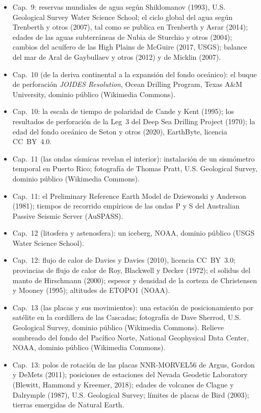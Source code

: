 \begin{itemize}
  \item Cap.~9: reservas mundiales de agua según Shiklomanov (1993), U.S. Geological Survey Water Science School; el ciclo global del agua según Trenberth y otros (2007), tal como se publica en Trenberth y Asrar (2014); edades de las aguas subterráneas de Nubia de Sturchio y otros (2004); cambios del acuífero de las High Plains de McGuire (2017, USGS); balance del mar de Aral de Gaybullaev y otros (2012) y de Micklin (2007).
  \item Cap.~10 (de la deriva continental a la expansión del fondo oceánico): el buque de perforación \emph{JOIDES Resolution}, Ocean Drilling Program, Texas A\&M University, dominio público (Wikimedia Commons).
  \item Cap.~10: la escala de tiempo de polaridad de Cande y Kent (1995); los resultados de perforación de la Leg~3 del Deep Sea Drilling Project (1970); la edad del fondo oceánico de Seton y otros (2020), EarthByte, licencia CC~BY~4.0.
  \item Cap.~11 (las ondas sísmicas revelan el interior): instalación de un sismómetro temporal en Puerto Rico; fotografía de Thomas Pratt, U.S. Geological Survey, dominio público (Wikimedia Commons).
  \item Cap.~11: el Preliminary Reference Earth Model de Dziewonski y Anderson (1981); tiempos de recorrido empíricos de las ondas P y S del Australian Passive Seismic Server (AuSPASS).
  \item Cap.~12 (litosfera y astenosfera): un iceberg, NOAA, dominio público (USGS Water Science School).
  \item Cap.~12: flujo de calor de Davies y Davies (2010), licencia CC~BY~3.0; provincias de flujo de calor de Roy, Blackwell y Decker (1972); el solidus del manto de Hirschmann (2000); espesor y densidad de la corteza de Christensen y Mooney (1995); altitudes de ETOPO1 (NOAA).
  \item Cap.~13 (las placas y sus movimientos): una estación de posicionamiento por satélite en la cordillera de las Cascadas; fotografía de Dave Sherrod, U.S. Geological Survey, dominio público (Wikimedia Commons). Relieve sombreado del fondo del Pacífico Norte, National Geophysical Data Center, NOAA, dominio público (Wikimedia Commons).
  \item Cap.~13: polos de rotación de las placas NNR-MORVEL56 de Argus, Gordon y DeMets (2011); posiciones de estaciones del Nevada Geodetic Laboratory (Blewitt, Hammond y Kreemer, 2018); edades de volcanes de Clague y Dalrymple (1987), U.S. Geological Survey; límites de placas de Bird (2003); tierras emergidas de Natural Earth.

\end{itemize}
